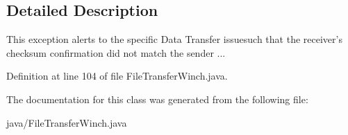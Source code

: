 \subsection{Detailed Description}
This exception alerts to the specific Data Transfer issuesuch that the receiver's checksum confirmation did not match the sender ... 



Definition at line 104 of file File\-Transfer\-Winch.\-java.



The documentation for this class was generated from the following file\-:\begin{DoxyCompactItemize}
\item 
java/File\-Transfer\-Winch.\-java\end{DoxyCompactItemize}
